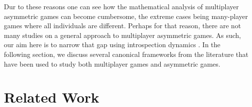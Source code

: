 \documentclass[11pt]{article}
\theoremstyle{plainCl1}
\theoremstyle{plainCl2}
\begin{document}
\noindent Dur to these reasons one can see how the mathematical analysis of multiplayer asymmetric games can become cumbersome, the extreme cases being many-player games where all individuals are different. Perhaps for that reason, there are not many studies on a general approach to multiplayer asymmetric games. As such, our aim here is to narrow that gap using introspection dynamics \cite{Couto:NJP:2022}. In the following section, we discuss several canonical frameworks from the literature that have been used to study both multiplayer games and asymmetric games.%


\section*{Related Work}

\end{document}
